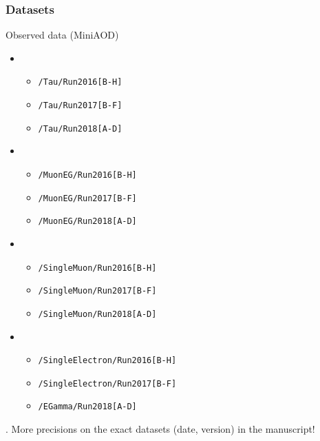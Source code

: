 \begin{frame}
\frametitle{Datasets}

\begin{block}{Observed data (MiniAOD)}
\begin{minipage}[t]{.49\linewidth}
\begin{itemize}
\item \tauh\tauh
\begin{itemize}
\item \texttt{/Tau/Run2016[B-H]}
\item \texttt{/Tau/Run2017[B-F]}
\item \texttt{/Tau/Run2018[A-D]}
\end{itemize}
\item \ele\mu
\begin{itemize}
\item \texttt{/MuonEG/Run2016[B-H]}
\item \texttt{/MuonEG/Run2017[B-F]}
\item \texttt{/MuonEG/Run2018[A-D]}
\end{itemize}
\end{itemize}
\end{minipage}
\begin{minipage}[t]{.49\linewidth}
\begin{itemize}
\item \mu\tauh
\begin{itemize}
\item \texttt{/SingleMuon/Run2016[B-H]}
\item \texttt{/SingleMuon/Run2017[B-F]}
\item \texttt{/SingleMuon/Run2018[A-D]}
\end{itemize}
\item \ele\tauh
\begin{itemize}
\item \texttt{/SingleElectron/Run2016[B-H]}
\item \texttt{/SingleElectron/Run2017[B-F]}
\item \texttt{/EGamma/Run2018[A-D]}
\end{itemize}
\end{itemize}
\end{minipage}
\end{block}

\begin{center}
\footnotesize
\up{*}.\quad
More precisions on the exact datasets (date, version) in the manuscript!
\end{center}
\end{frame}

